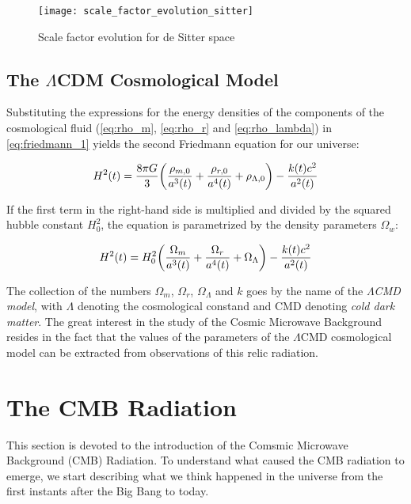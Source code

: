 \begin{figure}
        \centering
        \texttt{[image: scale\_factor\_evolution\_sitter]}
        \caption{Scale factor evolution for de Sitter space}
        \label{fig:scale_factor_evolution_sitter}
\end{figure}

\subsection{The \texorpdfstring{$\Lambda$}{LAMBDA-}CDM Cosmological Model}

Substituting the expressions for the energy densities of the components of
the cosmological fluid (\autoref{eq:rho_m}, \autoref{eq:rho_r} and
\autoref{eq:rho_lambda}) in \autoref{eq:friedmann_1} yields the second
Friedmann equation for our universe:

\begin{equation}
        H^2\qty(t) = \frac{8\pi G}{3} \qty(\frac{\rho_{m,0}}{a^3\qty(t)} +
        \frac{\rho_{r,0}}{a^4\qty(t)} + \rho_{\Lambda,0}) -
        \frac{k\qty(t) c^2}{a^2\qty(t)}
\end{equation}

If the first term in the right-hand side is multiplied and
divided by the squared hubble constant $H^2_0$, the equation is parametrized
by the density parameters $\Omega_w$:

\begin{equation}
        H^2\qty(t) = H^2_0 \qty(\frac{\Omega_m}{a^3\qty(t)} +
        \frac{\Omega_r}{a^4\qty(t)} + \Omega_\Lambda) -
        \frac{k\qty(t) c^2}{a^2\qty(t)}
\end{equation}

The collection of the numbers $\Omega_m$, $\Omega_r$, $\Omega_\Lambda$ and
$k$ goes by the name of the \emph{$\Lambda$CMD model}, with $\Lambda$
denoting the cosmological constand and CMD denoting \emph{cold dark matter}.
The great interest in the study of the Cosmic Microwave Background resides
in the fact that the values of the parameters of the $\Lambda$CMD
cosmological model can be extracted from observations of this relic
radiation.

\section{The CMB Radiation}

This section is devoted to the introduction of the Comsmic Microwave
Background (CMB) Radiation. To understand what caused the CMB radiation to
emerge, we start describing what we think happened in the universe from the
first instants after the Big Bang to today.

